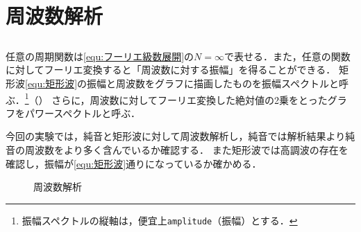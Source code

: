\chapter{周波数解析}
\section{\kadaiba}\label{sec:\kadaiba}
\purpose
任意の周期関数は\eqref{equ:フーリエ級数展開}の\(N=\infty\)で表せる．また，任意の関数に対してフーリエ変換すると「周波数に対する振幅」を得ることができる．
矩形波\eqref{equ:矩形波}の振幅と周波数をグラフに描画したものを振幅スペクトルと呼ぶ．\footnote{振幅スペクトルの縦軸は，便宜上\texttt{amplitude}（振幅）とする．}（）
さらに，周波数に対してフーリエ変換した絶対値の2乗をとったグラフをパワースペクトルと呼ぶ．\par
今回の実験では，純音と矩形波に対して周波数解析し，純音では解析結果より純音の周波数をより多く含んでいるか確認する．
また矩形波では高調波の存在を確認し，振幅が\eqref{equ:矩形波}通りになっているか確かめる．
\begin{figure}[H]
    \centering
    \scalebox{0.7}{
        
    }
    \caption{周波数解析}
    \label{fig:周波数解析}
\end{figure}
\method
